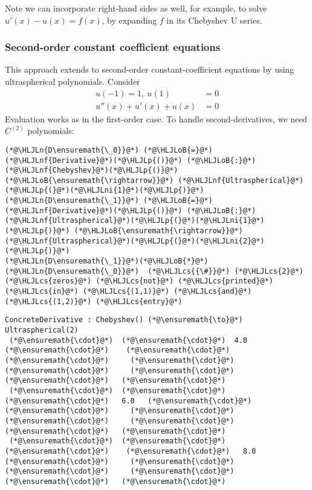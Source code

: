 \documentclass[12pt,landscape]{article}
\newcommand{\HLJLn}[1]{#1}
\newcommand{\HLJLnf}[1]{\textcolor[RGB]{66,102,213}{#1}}
\newcommand{\HLJLni}[1]{\textcolor[RGB]{59,151,46}{#1}}
\newcommand{\HLJLoB}[1]{\textcolor[RGB]{102,102,102}{\textbf{#1}}}
\newcommand{\HLJLp}[1]{#1}
\newcommand{\HLJLcs}[1]{\textcolor[RGB]{153,153,119}{\textit{#1}}}
\begin{document}
{Note we can incorporate right-hand sides as well, for example, to solve $u'(x) - u(x) = f(x)$, by expanding $f$ in its Chebyshev U series.

\subsubsection{Second-order constant coefficient equations}
This approach extends to second-order constant-coefficient equations by using ultraspherical polynomials.  Consider
\begin{align*}
u(-1) = 1,\: u(1) &= 0\\
u''(x) + u'(x)  + u(x) &= 0
\end{align*}
Evaluation works as in the first-order case. To handle second-derivatives, we need $C^{(2)}$ polynomials:
{\Large
\begin{lstlisting}
(*@\HLJLn{D\ensuremath{\_0}}@*) (*@\HLJLoB{=}@*) (*@\HLJLnf{Derivative}@*)(*@\HLJLp{()}@*) (*@\HLJLoB{:}@*) (*@\HLJLnf{Chebyshev}@*)(*@\HLJLp{()}@*) (*@\HLJLoB{\ensuremath{\rightarrow}}@*) (*@\HLJLnf{Ultraspherical}@*)(*@\HLJLp{(}@*)(*@\HLJLni{1}@*)(*@\HLJLp{)}@*)
(*@\HLJLn{D\ensuremath{\_1}}@*) (*@\HLJLoB{=}@*) (*@\HLJLnf{Derivative}@*)(*@\HLJLp{()}@*) (*@\HLJLoB{:}@*) (*@\HLJLnf{Ultraspherical}@*)(*@\HLJLp{(}@*)(*@\HLJLni{1}@*)(*@\HLJLp{)}@*) (*@\HLJLoB{\ensuremath{\rightarrow}}@*) (*@\HLJLnf{Ultraspherical}@*)(*@\HLJLp{(}@*)(*@\HLJLni{2}@*)(*@\HLJLp{)}@*)
(*@\HLJLn{D\ensuremath{\_1}}@*)(*@\HLJLoB{*}@*)(*@\HLJLn{D\ensuremath{\_0}}@*)  (*@\HLJLcs{{\#}}@*) (*@\HLJLcs{2}@*) (*@\HLJLcs{zeros}@*) (*@\HLJLcs{not}@*) (*@\HLJLcs{printed}@*) (*@\HLJLcs{in}@*) (*@\HLJLcs{(1,1)}@*) (*@\HLJLcs{and}@*) (*@\HLJLcs{(1,2)}@*) (*@\HLJLcs{entry}@*)
\end{lstlisting}
\begin{lstlisting}
ConcreteDerivative : Chebyshev() (*@\ensuremath{\to}@*) Ultraspherical(2)
 (*@\ensuremath{\cdot}@*)  (*@\ensuremath{\cdot}@*)  4.0   (*@\ensuremath{\cdot}@*)    (*@\ensuremath{\cdot}@*)     (*@\ensuremath{\cdot}@*)     (*@\ensuremath{\cdot}@*)     (*@\ensuremath{\cdot}@*)     (*@\ensuremath{\cdot}@*)     (*@\ensuremath{\cdot}@*)   (*@\ensuremath{\cdot}@*)
 (*@\ensuremath{\cdot}@*)  (*@\ensuremath{\cdot}@*)   (*@\ensuremath{\cdot}@*)   6.0   (*@\ensuremath{\cdot}@*)     (*@\ensuremath{\cdot}@*)     (*@\ensuremath{\cdot}@*)     (*@\ensuremath{\cdot}@*)     (*@\ensuremath{\cdot}@*)     (*@\ensuremath{\cdot}@*)   (*@\ensuremath{\cdot}@*)
 (*@\ensuremath{\cdot}@*)  (*@\ensuremath{\cdot}@*)   (*@\ensuremath{\cdot}@*)    (*@\ensuremath{\cdot}@*)   8.0    (*@\ensuremath{\cdot}@*)     (*@\ensuremath{\cdot}@*)     (*@\ensuremath{\cdot}@*)     (*@\ensuremath{\cdot}@*)     (*@\ensuremath{\cdot}@*)   (*@\ensuremath{\cdot}@*)

\end{lstlisting}}}
\end{document}
